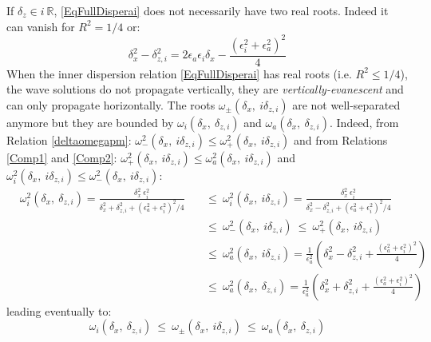 \documentclass[a4paper,11pt]{article}
\begin{document}
If $\delta_z\in i\ \mathbb{R}$, \ref{EqFullDisperai} does not necessarily have two real roots. Indeed it can vanish for $R^2=1/4$ or:
\begin{equation}
	\delta_x^2-\delta_{z,i}^2=2\epsilon_a\epsilon_i\delta_x 
	-\frac{(\epsilon_i^2+\epsilon_a^2)^2}{4}
\end{equation} 
When the inner dispersion relation \ref{EqFullDisperai} has real roots (i.e. $R^2\leq1/4$), the wave solutions do not propagate vertically, they are \textit{vertically-evanescent} and can only propagate horizontally. The roots $\omega_{\pm}(\delta_x,\ i\delta_{z,i})$ are not well-separated anymore but they are bounded by $\omega_{i}(\delta_x,\ \delta_{z,i})$ and $\omega_{a}(\delta_x,\ \delta_{z,i})$. Indeed,  from Relation \ref{deltaomegapm}: $\omega_{-}^2(\delta_x,\ i\delta_{z,i})\leq\omega_{+}^2(\delta_x,\ i\delta_{z,i})$ and from Relations \ref{Comp1} and \ref{Comp2}: $\omega_+^2(\delta_x,\ i\delta_{z,i})\leq\omega_a^2(\delta_x,\ i\delta_{z,i})$ and $\omega_i^2(\delta_x,\ i\delta_{z,i})\leq\omega_-^2(\delta_x,\ i\delta_{z,i})$:
\begin{subequations}
	\begin{alignat}{2}	
	\nonumber&\omega_{i}^2(\delta_x,\ \delta_{z,i})=
	\frac{\delta_x^2\ \epsilon_i^2}{\delta_x^2+\delta_{z,i}^2
	+(\epsilon_a^2+\epsilon_i^2)^2/4}
	&&\ \leq\  
	\omega_{i}^2(\delta_x,\ i\delta_{z,i})=
	\frac{\delta_x^2\ \epsilon_i^2}{\delta_x^2-\delta_{z,i}^2
	+(\epsilon_a^2+\epsilon_i^2)^2/4}\\[3mm]
	\nonumber& &&\ \leq\ \omega_-^2(\delta_x,\ i\delta_{z,i})\ \leq\ \omega_+^2(\delta_x,\ i\delta_{z,i})\\[3mm]
	\nonumber& &&\ \leq\  
	\omega_{a}^2(\delta_x,\ i\delta_{z,i})=\frac{1}{\epsilon_a^2}\left(
	\delta_x^2-\delta_{z,i}^2
	+\frac{(\epsilon_a^2+\epsilon_i^2)^2}{4}
	\right)\\[3mm]
	\nonumber& &&\ \leq\ 
	\omega_{a}^2(\delta_x,\ \delta_{z,i})=\frac{1}{\epsilon_a^2}\left(
	\delta_x^2+\delta_{z,i}^2
	+\frac{(\epsilon_a^2+\epsilon_i^2)^2}{4}
	\right)
	\end{alignat}
\end{subequations}
leading eventually to:
\begin{equation}
	\omega_{i}(\delta_x,\ \delta_{z,i})
	\ \leq\  
	\omega_{\pm}(\delta_x,\ i\delta_{z,i})
	\ \leq\ 
	\omega_{a}(\delta_x,\ \delta_{z,i})
	\label{RelInequal}
\end{equation}
\end{document}
